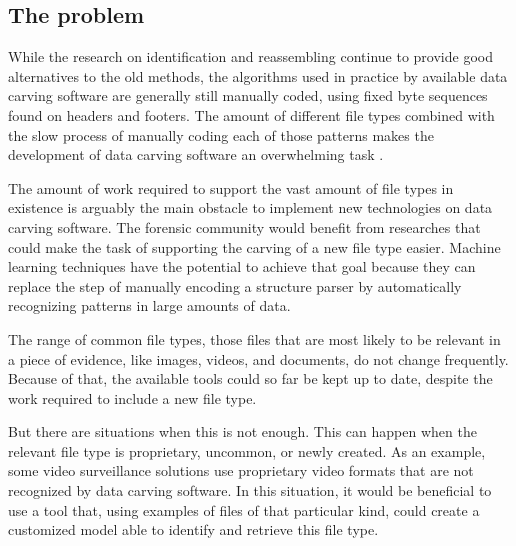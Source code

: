 \subsection{The problem}
While the research on identification and reassembling continue to provide good alternatives to the old methods, the algorithms used in practice by available data carving software are generally still manually coded, using fixed byte sequences found on headers and footers. The amount of different file types combined with the slow process of manually coding each of those patterns makes the development of data carving software an overwhelming task \cite{mcdaniel_content_2003}. 



The amount of work required to support the vast amount of file types in existence is arguably the main obstacle to implement new technologies on data carving software. The forensic community would benefit from researches that could make the task of supporting the carving of a new file type easier. Machine learning techniques have the potential to achieve that goal because they can replace the step of manually encoding a structure parser by automatically recognizing patterns in large amounts of data.

The range of common file types, those files that are most likely to be relevant in a piece of evidence, like images, videos, and documents, do not change frequently. Because of that, the available tools could so far be kept up to date, despite the work required to include a new file type.

But there are situations when this is not enough. This can happen when the relevant file type is proprietary, uncommon, or newly created. As an example, some video surveillance solutions use proprietary video formats that are not recognized by data carving software. In this situation, it would be beneficial to use a tool that, using examples of files of that particular kind, could create a customized model able to identify and retrieve this file type.

